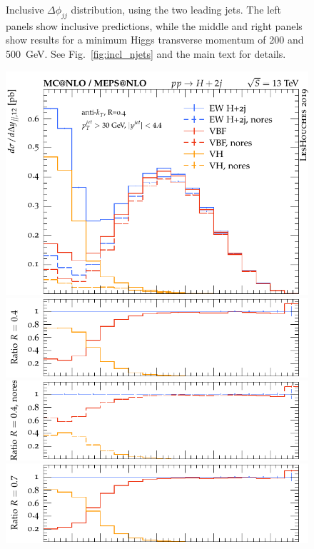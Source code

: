 \documentclass[10pt,prd,fleqn,superscriptaddress,notitlepage,nofootinbib,preprintnumbers,nobalancelastpage]{revtex4-1}
\begin{document}
\begin{figure}[p]
\begin{minipage}{.28\textwidth}
  \end{minipage}
\caption{Inclusive $\Delta\phi_{jj}$ distribution, using the two leading jets.
The left panels show inclusive predictions, while the middle and right panels
show results for a minimum Higgs transverse momentum of 200 and 500~GeV.
See Fig.~\ref{fig:incl_njets} and the main text for details.}
\label{fig:incl_delta_phi_jj12}
\end{figure}%
\begin{figure}[p]
    \centering
    \begin{minipage}{0.28\textwidth}
     \includegraphics[width=\textwidth]{figures/vbfvh/nores-pt0-main.pdf}
     \includegraphics[width=\textwidth]{figures/vbfvh/nores-pt0-ratio1.pdf}
    \includegraphics[width=\textwidth]{figures/vbfvh/nores-pt0-ratio2.pdf}
    \includegraphics[width=\textwidth]{figures/vbfvh/nores-pt0-ratio3.pdf}

\end{minipage}
\end{figure}
\end{document}
